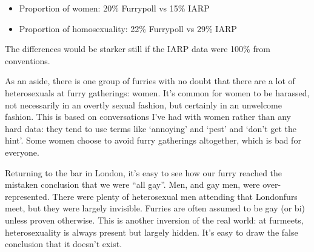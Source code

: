 \begin{itemize}
  \item Proportion of women: 20\% Furrypoll vs 15\% IARP
  \item Proportion of homosexuality: 22\% Furrypoll vs 29\% IARP
\end{itemize}

The differences would be starker still if the IARP data were 100\% from conventions.

As an aside, there is one group of furries with no doubt that there are a lot of heterosexuals at furry gatherings: women. It's common for women to be harassed, not necessarily in an overtly sexual fashion, but certainly in an unwelcome fashion. This is based on conversations I've had with women rather than any hard data: they tend to use terms like `annoying' and `pest' and `don't get the hint'. Some women choose to avoid furry gatherings altogether, which is bad for everyone.

Returning to the bar in London, it's easy to see how our furry reached the mistaken conclusion that we were ``all gay''. Men, and gay men, were over-represented. There were plenty of heterosexual men attending that Londonfurs meet, but they were largely invisible. Furries are often assumed to be gay (or bi) unless proven otherwise. This is another inversion of the real world: at furmeets, heterosexuality is always present but largely hidden. It's easy to draw the false conclusion that it doesn't exist.
